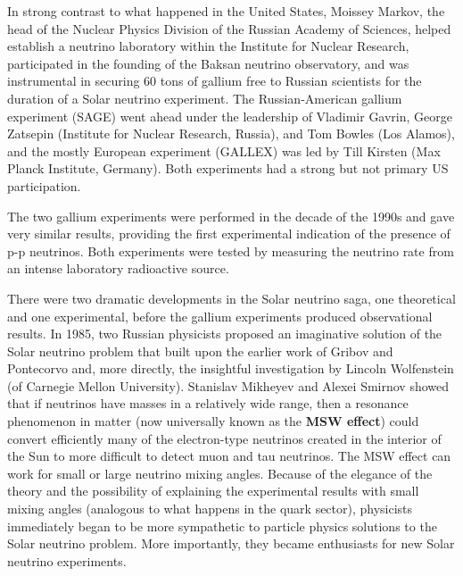 \documentclass[a4paper,10pt]{article}
\begin{document}
{\noindent}In strong contrast to what happened in the United States, Moissey Markov, the head of the Nuclear Physics Division of the Russian Academy of Sciences, helped establish a neutrino laboratory within the Institute for Nuclear Research, participated in the founding of the Baksan neutrino observatory, and was instrumental in securing $60$ tons of gallium free to Russian scientists for the duration of a Solar neutrino experiment. The Russian-American gallium experiment (SAGE) went ahead under the leadership of Vladimir Gavrin, George Zatsepin (Institute for Nuclear Research, Russia), and Tom Bowles (Los Alamos), and the mostly European experiment (GALLEX) was led by Till Kirsten (Max Planck Institute, Germany). Both experiments had a strong but not primary US participation.

{\noindent}The two gallium experiments were performed in the decade of the 1990s and gave very similar results, providing the first experimental indication of the presence of p-p neutrinos. Both experiments were tested by measuring the neutrino rate from an intense laboratory radioactive source.

{\noindent}There were two dramatic developments in the Solar neutrino saga, one theoretical and one experimental, before the gallium experiments produced observational results. In 1985, two Russian physicists proposed an imaginative solution of the Solar neutrino problem that built upon the earlier work of Gribov and Pontecorvo and, more directly, the insightful investigation by Lincoln Wolfenstein (of Carnegie Mellon University). Stanislav Mikheyev and Alexei Smirnov showed that if neutrinos have masses in a relatively wide range, then a resonance phenomenon in matter (now universally known as the \textbf{MSW effect}) could convert efficiently many of the electron-type neutrinos created in the interior of the Sun to more difficult to detect muon and tau neutrinos. The MSW effect can work for small or large neutrino mixing angles. Because of the elegance of the theory and the possibility of explaining the experimental results with small mixing angles (analogous to what happens in the quark sector), physicists immediately began to be more sympathetic to particle physics solutions to the Solar neutrino problem. More importantly, they became enthusiasts for new Solar neutrino experiments.
\end{document}
